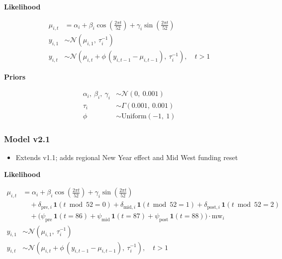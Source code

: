 \documentclass[
]{article}
\providecommand{\tightlist}{%
  \setlength{\itemsep}{0pt}\setlength{\parskip}{0pt}}
\begin{document}
\textbf{Likelihood}

\[
\begin{aligned}
\mu_{i,t} &= \alpha_i
              + \beta_i \cos\!\left(\tfrac{2\pi t}{52}\right)
              + \gamma_i \sin\!\left(\tfrac{2\pi t}{52}\right) \\[4pt]
y_{i,1} &\sim \mathcal{N}(\mu_{i,1},\ \tau_i^{-1}) \\[4pt]
y_{i,t} &\sim \mathcal{N}\!\left(\mu_{i,t} + \phi\,(y_{i,t-1} - \mu_{i,t-1}),\ \tau_i^{-1}\right), \quad t > 1
\end{aligned}
\]

\textbf{Priors}

\[
\begin{aligned}
\alpha_i,\ \beta_i,\ \gamma_i &\sim \mathcal{N}(0,\ 0.001) \\[4pt]
\tau_i &\sim \Gamma(0.001,\ 0.001) \\[4pt]
\phi   &\sim \mathrm{Uniform}(-1,\ 1)
\end{aligned}
\]

\subsubsection*{\texorpdfstring{Model v2.1 \label{sect:model}}{Model v2.1 }}\label{model-v2.1}

\begin{itemize}
\tightlist
\item
  Extends v1.1; adds regional New Year effect and Mid West funding reset
\end{itemize}

\textbf{Likelihood}

\[
\begin{aligned}
\mu_{i,t} &= \alpha_i
              + \beta_i \cos\!\left(\tfrac{2\pi t}{52}\right)
              + \gamma_i \sin\!\left(\tfrac{2\pi t}{52}\right) \\[4pt]
           &\quad + \delta_{\text{pre},i}\,\mathbf{1}(t \bmod 52 = 0)
              + \delta_{\text{mid},i}\,\mathbf{1}(t \bmod 52 = 1)
              + \delta_{\text{post},i}\,\mathbf{1}(t \bmod 52 = 2) \\[4pt]
           &\quad + \bigl(\psi_{\text{pre}}\,\mathbf{1}(t = 86)
              + \psi_{\text{mid}}\,\mathbf{1}(t = 87)
              + \psi_{\text{post}}\,\mathbf{1}(t = 88)\bigr)\cdot\mathrm{mw}_i \\[4pt]
y_{i,1} &\sim \mathcal{N}(\mu_{i,1},\ \tau_i^{-1}) \\[4pt]
y_{i,t} &\sim \mathcal{N}\!\left(\mu_{i,t} + \phi\,(y_{i,t-1} - \mu_{i,t-1}),\ \tau_i^{-1}\right), \quad t > 1
\end{aligned}
\]
\end{document}

